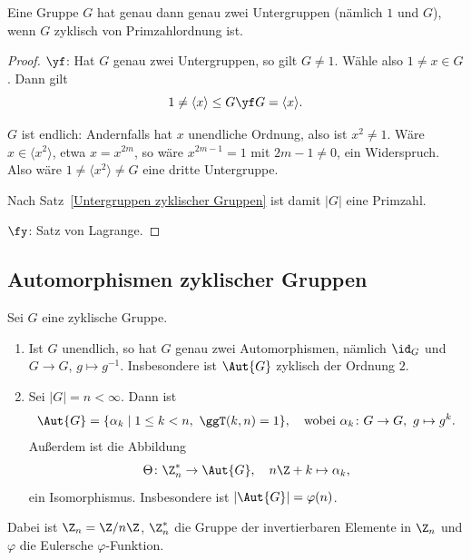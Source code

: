\documentclass[11pt]{article}
\begin{document}
\begin{theorem}\Theorem
  Eine Gruppe $G$ hat genau dann genau zwei Untergruppen (nämlich $1$ und $G$), wenn $G$ zyklisch von Primzahlordnung ist.
\end{theorem}


\begin{proof}
  \glqq$\yf$\grqq: Hat $G$ genau zwei Untergruppen, so gilt $G \neq 1$. Wähle also $1 \neq x \in G$. Dann gilt
  \[ 1 \neq \langle x \rangle \le G \yf G = \langle x \rangle. \]
\begin{ergaenzung}
  $G$ ist endlich: Andernfalls hat $x$ unendliche Ordnung, also ist $x^2 \neq 1$. Wäre $x \in \langle x^2 \rangle$, etwa $x = x^{2m}$, so wäre $x^{2m-1} = 1$ mit $2m - 1 \neq 0$, ein Widerspruch. Also wäre $1 \neq \langle x^2 \rangle \neq G$ eine dritte Untergruppe.
  \end{ergaenzung}
  Nach Satz~\ref{Untergruppen zyklischer Gruppen} ist damit $\lvert G \rvert$ eine Primzahl.

  \glqq$\fy$\grqq: Satz von Lagrange.
\end{proof}

\subsection{Automorphismen zyklischer Gruppen}

\begin{theorem}\Theorem
  Sei $G$ eine zyklische Gruppe.
  \begin{enumerate}[label=(\roman*)]
    \item Ist $G$ unendlich, so hat $G$ genau zwei Automorphismen, nämlich $\id_G$ und $G \to G$, $g \mapsto g^{-1}$. Insbesondere ist $\Aut{G}$ zyklisch der Ordnung $2$.
    \item Sei $\lvert G \rvert = n < \infty$. Dann ist
      \[ \Aut{G} = \{\alpha_k \mid 1 \le k < n,\ \ggT(k, n) = 1\}, \quad \text{wobei } \alpha_k\colon G \to G,\ g \mapsto g^k. \]
      Außerdem ist die Abbildung
      \[ \Theta\colon \Z_n^* \to \Aut{G}, \quad n\Z + k \mapsto \alpha_k, \]
      ein Isomorphismus. Insbesondere ist $\lvert \Aut{G} \rvert = \varphi(n)$.
  \end{enumerate}
  Dabei ist $\Z_n = \Z / n\Z$, $\Z_n^*$ die Gruppe der invertierbaren Elemente in $\Z_n$ und $\varphi$ die Eulersche $\varphi$-Funktion.
\end{theorem}
\end{document}

